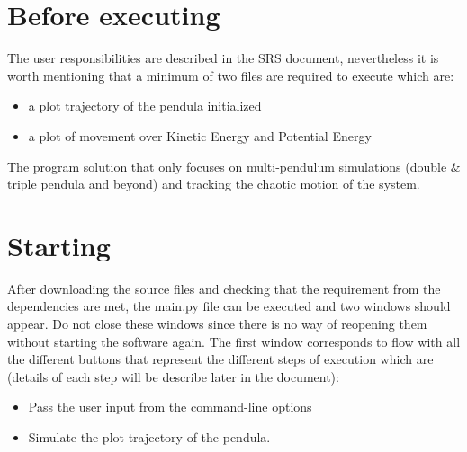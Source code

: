 \documentclass[12pt, titlepage]{article}
\begin{document}
\section{Before executing \progname{}}

The user responsibilities are described in the SRS document, nevertheless it 
is worth mentioning that a minimum of two files are required to execute 
\progname{} which are:
\begin{itemize}
\item a plot trajectory of the pendula initialized
\item a plot of movement over Kinetic Energy and Potential Energy
\end{itemize}
The \progname program solution that only focuses on multi-pendulum 
simulations (double \& triple pendula and beyond) and tracking the chaotic
motion of the system.

\section{Starting \progname{}}

After downloading the source files and checking that the requirement from the 
dependencies are met, the main.py file can be executed and two windows should 
appear. Do not close these windows since there is no way of reopening them 
without starting the software again. The first window %
corresponds to \progname{} flow with all the different buttons that represent 
the different steps of execution which are 
(details of each step will be describe later in the document):

\begin{itemize}
\item %
Pass the user input from the command-line options
\item %
Simulate the plot trajectory of the pendula.
\end{itemize}



\end{document}
